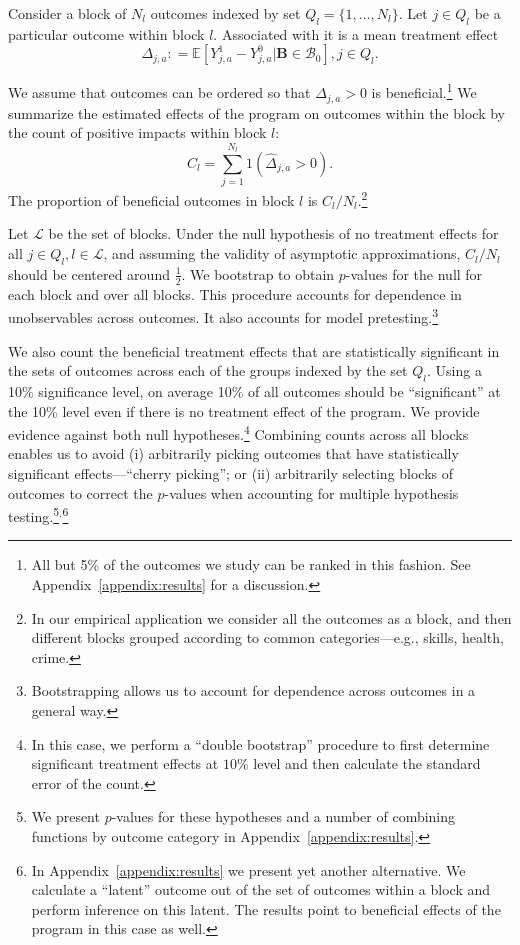 Consider a block of $N_l$ outcomes indexed by set $Q_l = \{1,\dots,N_l\}$. Let $j \in Q_l$ be a particular outcome within block $l$. Associated with it is a mean treatment effect
\begin{equation}
\Delta_{j,a} : = \mathbb{E} \left[ Y^1_{j,a} - Y^0_{j,a} | \bm{B} \in \mathcal{B}_0 \right], j \in Q_l.
\end{equation}

We assume that outcomes can be ordered so that $\Delta_{j,a} >0$ is beneficial.\footnote{All but 5\% of the outcomes we study can be ranked in this fashion. See Appendix~\ref{appendix:results} for a discussion.} We summarize the estimated effects of the program on outcomes within the block by the count of positive impacts within block $l$:
\begin{equation}
C_l = \sum^{N_l}_{j=1} 1 (\hat{\Delta}_{j,a} >0).
\end{equation}
The proportion of beneficial outcomes in block $l$ is $C_l / N_l$.\footnote{In our empirical application we consider all the outcomes as a block, and then different blocks grouped according to common categories---e.g., skills, health, crime.}

Let $\mathcal{L}$ be the set of blocks. Under the null hypothesis of no treatment effects for all $j \in Q_l, l \in \mathcal{L}$, and assuming the validity of asymptotic approximations, $C_l / N_l$ should be centered around $\frac{1}{2}$. We bootstrap to obtain $p$-values for the null for each block and over all blocks. This procedure accounts for dependence in unobservables across outcomes. It also accounts for model pretesting.\footnote{Bootstrapping allows us to account for dependence across outcomes in a general way.}

We also count the beneficial treatment effects that are statistically significant in the sets of outcomes across each of the groups indexed by the set $Q_l$. Using a 10\% significance level, on average 10\% of all outcomes should be ``significant'' at the 10\% level even if there is no treatment effect of the program. We provide evidence against both null hypotheses.\footnote{In this case, we perform a ``double bootstrap'' procedure to first determine significant treatment effects at $10\%$ level and then calculate the standard error of the count.} Combining counts across all blocks enables us to avoid (i) arbitrarily picking outcomes that have statistically significant effects---``cherry picking''; or (ii) arbitrarily selecting blocks of outcomes to correct the $p$-values when accounting for multiple hypothesis testing.\footnote{We present $p$-values for these hypotheses and a number of combining functions by outcome category in Appendix~\ref{appendix:results}.}$^{\text{,}}$\footnote{In Appendix~\ref{appendix:results} we present yet another alternative. We calculate a ``latent'' outcome out of the set of outcomes within a block and perform inference on this latent. The results point to beneficial effects of the program in this case as well.} 